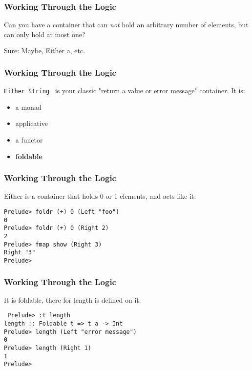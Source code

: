 \documentclass{beamer}
\begin{document}
\begin{frame}
\frametitle{Working Through the Logic}
\begin{center}
{\Large 
Can you have a container that can \textsl{not} hold an arbitrary number
of elements, but can only hold at most one?

\vspace{32pt}

Sure:  Maybe, Either a, etc.
}

\end{center}
\end{frame}

\begin{frame}
\frametitle{Working Through the Logic}
{\Large
{\tt Either String } is your classic "return a value or error message"
container.  It is:
\begin{itemize}
\item a monad
\item applicative
\item a functor
\item \textbf{foldable}
\end{itemize}
}
\end{frame}

\begin{frame}[fragile]
\frametitle{Working Through the Logic}
{\Large
Either is a container that holds 0 or 1 elements, and acts like it:

{\tt Prelude> foldr (+) 0 (Left "foo") \\
0 \\
Prelude> foldr (+) 0 (Right 2) \\
2 \\
Prelude> fmap show (Right 3) \\
Right "3" \\
Prelude> \\
}}
\end{frame}

\begin{frame}[fragile]
\frametitle{Working Through the Logic}
{\Large
It is foldable, there for length is defined on it:

\vspace{32pt}

{\tt
Prelude> :t length \\
length :: Foldable t => t a -> Int \\
Prelude> length (Left "error message") \\
0 \\
Prelude> length (Right 1) \\
1 \\
Prelude> 
}}
\end{frame}
\end{document}
